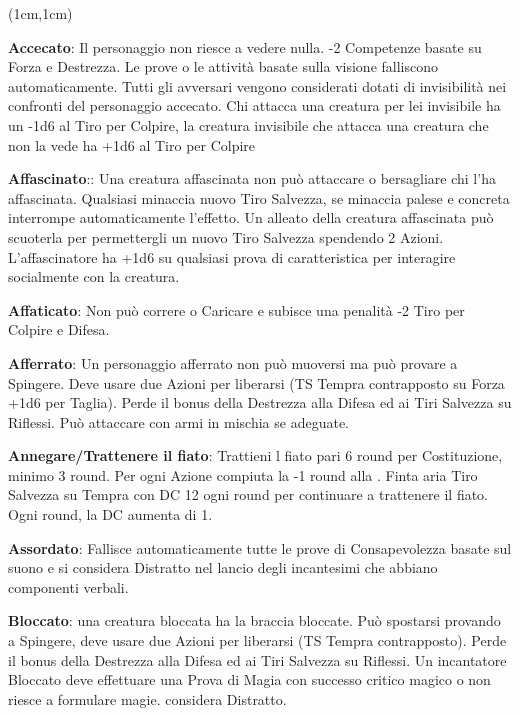 \documentclass[a4paper,12 pt,openany]{book}
\begin{document}
\center

\footnotesize

\begin{textblock*}{19 cm}(1cm,1cm) %
\flushleft

\begin{multicols}{2}

\textbf{Accecato}: Il personaggio non riesce a vedere nulla. -2 Competenze basate su Forza e Destrezza. Le prove o le attività basate sulla visione falliscono automaticamente. Tutti gli avversari vengono considerati dotati di invisibilità nei confronti del personaggio accecato.  Chi attacca una creatura per lei invisibile ha un -1d6 al Tiro per Colpire, la creatura invisibile che attacca una creatura che non la vede ha +1d6 al Tiro per Colpire

\textbf{Affascinato}:: Una creatura affascinata non può attaccare o bersagliare chi l’ha affascinata. Qualsiasi minaccia nuovo Tiro Salvezza, se minaccia palese e concreta interrompe automaticamente l'effetto. Un alleato della creatura affascinata può scuoterla per permettergli un nuovo Tiro Salvezza spendendo 2 Azioni. L'affascinatore ha +1d6 su qualsiasi prova di caratteristica per interagire socialmente con la creatura.

\textbf{Affaticato}: Non può correre o Caricare e subisce una penalità -2 Tiro per Colpire e Difesa.

\textbf{Afferrato}: Un personaggio afferrato non può muoversi ma può provare a Spingere. Deve usare due Azioni per liberarsi (TS Tempra contrapposto su Forza +1d6 per Taglia). Perde il bonus della Destrezza alla Difesa ed ai Tiri Salvezza su Riflessi. Può attaccare con armi in mischia se adeguate.

\textbf{Annegare/Trattenere il fiato}:  Trattieni l fiato pari 6 round per Costituzione, minimo 3 round. Per ogni Azione compiuta la -1 round alla  . Finta aria Tiro Salvezza su Tempra con DC 12 ogni round per continuare a trattenere il fiato. Ogni round, la DC aumenta di 1.

\textbf{Assordato}: Fallisce automaticamente tutte le prove di Consapevolezza basate sul suono e si considera Distratto nel lancio degli incantesimi che abbiano componenti verbali.

\textbf{Bloccato}: una creatura bloccata ha la braccia bloccate. Può spostarsi provando a Spingere, deve usare due Azioni per liberarsi (TS Tempra contrapposto). Perde il bonus della Destrezza alla Difesa ed ai Tiri Salvezza su Riflessi. Un incantatore Bloccato deve effettuare una Prova di Magia con successo critico magico o non riesce a formulare magie. considera Distratto.


\end{multicols}
\end{textblock*}
\end{document}
